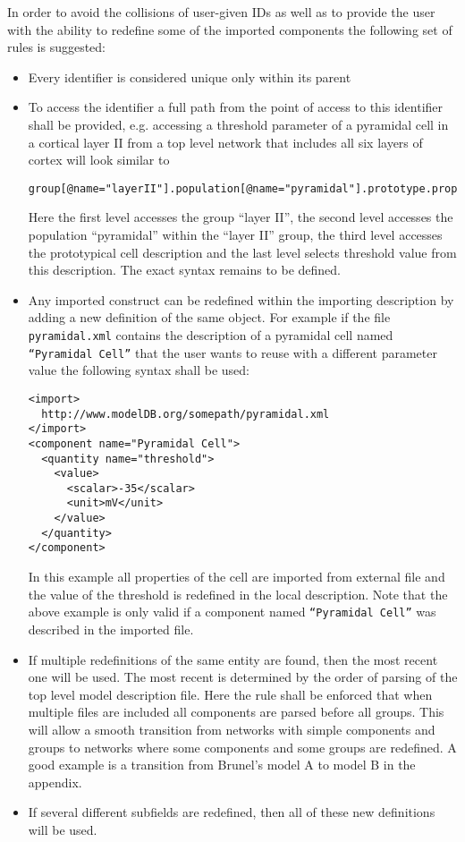 \documentclass{article}
\begin{document}
In order to avoid the collisions of user-given IDs as well as to
provide the user with the ability to redefine some of the imported
components the following set of rules is suggested:
\begin{itemize}
\item{Every identifier is considered unique only within its parent}
\item{To access the identifier a full path from the point of access
to this identifier shall be provided, e.g. accessing a threshold
parameter of a pyramidal cell in a cortical layer II from a top level
network that includes all six layers of cortex will look similar to
\begin{verbatim}
group[@name="layerII"].population[@name="pyramidal"].prototype.property[@name="threshold"].value
\end{verbatim}
Here the first level accesses the group ``layer II'', the second level
accesses the population ``pyramidal'' within the ``layer II'' group, the third
level accesses the prototypical cell description and the last level
selects threshold value from this description. The exact syntax remains to be
defined.}
\item{Any imported construct can be redefined within the importing
description by adding a new definition of the same object. For example
if the file {\tt pyramidal.xml} contains the description of a pyramidal
cell named {\tt ``Pyramidal Cell''} that the user wants to reuse with a
different parameter value the following syntax shall be used:
\begin{verbatim}
<import>
  http://www.modelDB.org/somepath/pyramidal.xml
</import>
<component name="Pyramidal Cell">
  <quantity name="threshold">
    <value>
      <scalar>-35</scalar>
      <unit>mV</unit>
    </value>
  </quantity>
</component>
\end{verbatim}
In this example all properties of the cell are imported from external
file and the value of the threshold is redefined in the local description.
Note that the above example is only valid if a component named {\tt ``Pyramidal
Cell''} was described in the imported file.}
\item{If multiple redefinitions of the same entity are found, then the most
recent one will be used. The most recent is determined by the order of
parsing of the top level model description file. Here the rule shall be
enforced that when multiple files are included all components are parsed before
all groups. This will allow a smooth transition from networks with simple
components and groups to networks where some components and some groups are redefined.
A good example is a transition from Brunel's model A to model B in the
appendix.}
\item{If several different subfields are redefined, then all of these
new definitions will be used.}
\end{itemize}
\end{document}
